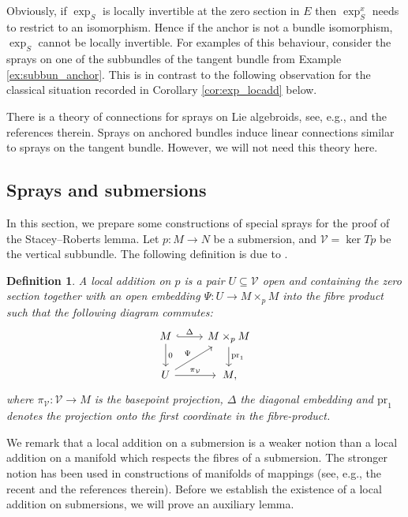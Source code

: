 \documentclass[pdftex]{sigma}
\numberwithin{equation}{section}
\newtheorem{Definition}[Theorem]{Definition}
\newcommand{\cV}{\ensuremath{\mathcal{V}}}
\begin{document}
 Obviously, if $\exp_S$ is locally invertible at the zero section in $E$ then $\exp_S^x$ needs to restrict to an isomorphism.
 Hence if the anchor is not a bundle isomorphism, $\exp_S$ cannot be locally invertible.
 For examples of this behaviour, consider the sprays on one of the subbundles of the tangent bundle from Example \ref{ex:subbun_anchor}.
 This is in contrast to the following observation for the classical situation recorded in Corollary \ref{cor:exp_locadd} below.

There is a theory of connections for sprays on Lie algebroids, see, e.g., \cite{CaF03} and the references therein. Sprays on anchored bundles induce linear connections similar to sprays on the tangent bundle. However, we will not need this theory here.

\subsection{Sprays and submersions}
In this section, we prepare some constructions of special sprays for the proof of the Stacey--Roberts lemma.
Let $p\colon M \rightarrow N$ be a submersion, and $\cV = \ker Tp$ be the vertical subbundle.
The following definition is due to \cite[Definition 3.2.15]{ste24}.

\begin{Definition}
A \emph{local addition on $p$} is a pair $U \subseteq \cV$ open and containing the zero section together with an open embedding $\Psi \colon U \rightarrow M \times_p M$ into the fibre product such that the following diagram commutes:
\begin{equation}\label{diag:loc_add_on_sub}
\begin{tikzcd}
M \arrow[r,hook,"\Delta"] \arrow[d,"0"]& M \times_p M \arrow[d,"\text{pr}_1"] \\
U \arrow[ru,"\Psi"] \arrow[r,"\pi_{\cV}"] & \,M,
\end{tikzcd}
\end{equation}
where $\pi_{\cV} \colon \cV \rightarrow M$ is the basepoint projection, $\Delta$ the diagonal embedding and $\text{pr}_1$ denotes the projection onto the first coordinate in the fibre-product.
\end{Definition}

We remark that a local addition on a submersion is a weaker notion than a local addition on a manifold which respects the fibres of a submersion. The stronger notion has been used in constructions of manifolds of mappings (see, e.g., the recent \cite[Section~5.9]{Mic20} and the references therein). Before we establish the existence of a local addition on submersions, we will prove an auxiliary lemma.
\end{document}
